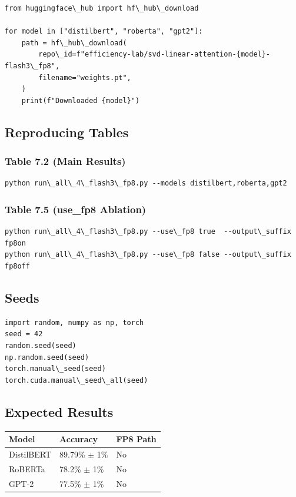 \begin{lstlisting}
from huggingface\_hub import hf\_hub\_download

for model in ["distilbert", "roberta", "gpt2"]:
    path = hf\_hub\_download(
        repo\_id=f"efficiency-lab/svd-linear-attention-{model}-flash3\_fp8",
        filename="weights.pt",
    )
    print(f"Downloaded {model}")
\end{lstlisting}

\subsection{Reproducing Tables}

\subsubsection{Table 7.2 (Main Results)}

\begin{lstlisting}
python run\_all\_4\_flash3\_fp8.py --models distilbert,roberta,gpt2
\end{lstlisting}

\subsubsection{Table 7.5 (use\_fp8 Ablation)}

\begin{lstlisting}
python run\_all\_4\_flash3\_fp8.py --use\_fp8 true  --output\_suffix fp8on
python run\_all\_4\_flash3\_fp8.py --use\_fp8 false --output\_suffix fp8off
\end{lstlisting}

\subsection{Seeds}

\begin{lstlisting}
import random, numpy as np, torch
seed = 42
random.seed(seed)
np.random.seed(seed)
torch.manual\_seed(seed)
torch.cuda.manual\_seed\_all(seed)
\end{lstlisting}

\subsection{Expected Results}

\begin{table}[H]
\centering
\small
\begin{tabular}{lll}
\toprule
\textbf{Model} & \textbf{Accuracy} & \textbf{FP8 Path} \\
\midrule
DistilBERT & 89.79\% $\pm$ 1\% & No \\
RoBERTa & 78.2\% $\pm$ 1\% & No \\
GPT-2 & 77.5\% $\pm$ 1\% & No \\
\bottomrule
\end{tabular}
\end{table}

